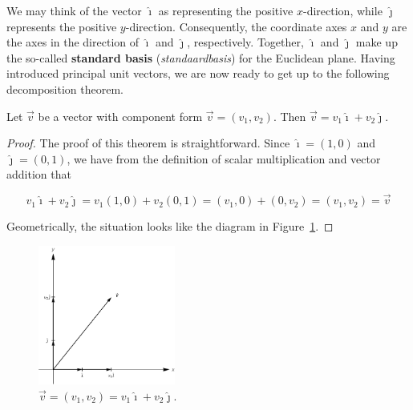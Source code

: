 We may think of the vector $\hat{\imath}$ as representing the positive $x$-direction, while $\hat{\jmath}$ represents the positive $y$-direction.  Consequently, the coordinate axes $x$ and $y$ are the axes in the direction of $\hat{\imath}$ and $\hat{\jmath}$, respectively. Together, $\hat{\imath}$ and $\hat{\jmath}$ make up the so-called \textbf{standard basis} (\textit{standaardbasis}) for the Euclidean plane. Having introduced principal unit vectors, we are now ready to get up to the following decomposition theorem.


\begin{theorem} \label{ijdecomp}  

 Let $\vec{v}$ be a vector with component form  $\vec{v} = \left( v_1 ,v_2\right)$. Then $\vec{v} = v_1 \hat{\imath} + v_2 \hat{\jmath}$. 


\end{theorem}

\ifcourse
\ifanalysis

\begin{proof}
The proof of this theorem is straightforward. Since $\hat{\imath} = \left(1,0\right)$ and $\hat{\jmath} = \left( 0,1\right)$, we have from the definition of scalar multiplication and vector addition that  

\[v_1 \hat{\imath} + v_2 \hat{\jmath} = v_1\left(1,0\right) + v_2\left(0,1\right) = \left(v_1,0\right) + \left(0,v_2\right) = \left(v_1,v_2\right) = \vec{v}\]

Geometrically, the situation looks like the diagram in Figure~\ref{fig_vector_10}.
\end{proof}

\begin{figure}
	\begin{center}
			\includegraphics[width=0.4\textwidth]{fig_vector_10}
	\caption{$\vec{v} = \left(v_1,v_2\right) = v_1\hat{\imath} + v_2 \hat{\jmath}$. }
	\label{fig_vector_10}
	\end{center}
\end{figure}



